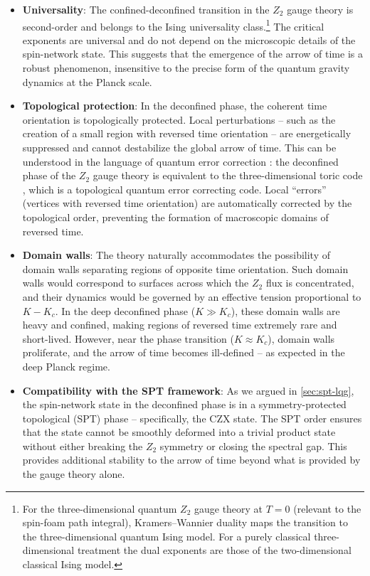 \documentclass[preprint]{SciPost}
\theoremstyle{plain} %
\begin{document}
\begin{itemize}
	\item \textbf{Universality}: The confined-deconfined transition in the $Z_2$ gauge theory is second-order and belongs to the Ising universality class.\footnote{For the three-dimensional quantum $Z_2$ gauge theory at $T=0$ (relevant to the spin-foam path integral), Kramers--Wannier duality maps the transition to the three-dimensional quantum Ising model. For a purely classical three-dimensional treatment the dual exponents are those of the two-dimensional classical Ising model.} The critical exponents are universal and do not depend on the microscopic details of the spin-network state. This suggests that the emergence of the arrow of time is a robust phenomenon, insensitive to the precise form of the quantum gravity dynamics at the Planck scale.

	\item \textbf{Topological protection}: In the deconfined phase, the coherent time orientation is topologically protected. Local perturbations -- such as the creation of a small region with reversed time orientation -- are energetically suppressed and cannot destabilize the global arrow of time. This can be understood in the language of quantum error correction \cite{Dennis2002Topological}: the deconfined phase of the $ Z_2 $ gauge theory is equivalent to the three-dimensional toric code \cite{Dennis2002Topological}, which is a topological quantum error correcting code. Local ``errors'' (vertices with reversed time orientation) are automatically corrected by the topological order, preventing the formation of macroscopic domains of reversed time.

	\item \textbf{Domain walls}: The theory naturally accommodates the possibility of domain walls separating regions of opposite time orientation. Such domain walls would correspond to surfaces across which the $ Z_2 $ flux is concentrated, and their dynamics would be governed by an effective tension proportional to $ K - K_c $. In the deep deconfined phase ($ K \gg K_c $), these domain walls are heavy and confined, making regions of reversed time extremely rare and short-lived. However, near the phase transition ($ K \approx K_c $), domain walls proliferate, and the arrow of time becomes ill-defined -- as expected in the deep Planck regime.

	\item \textbf{Compatibility with the SPT framework}: As we argued in \autoref{sec:spt-lqg}, the spin-network state in the deconfined phase is in a symmetry-protected topological (SPT) phase -- specifically, the CZX state. The SPT order ensures that the state cannot be smoothly deformed into a trivial product state without either breaking the $ Z_2 $ symmetry or closing the spectral gap. This provides additional stability to the arrow of time beyond what is provided by the gauge theory alone.
\end{itemize}
\end{document}
